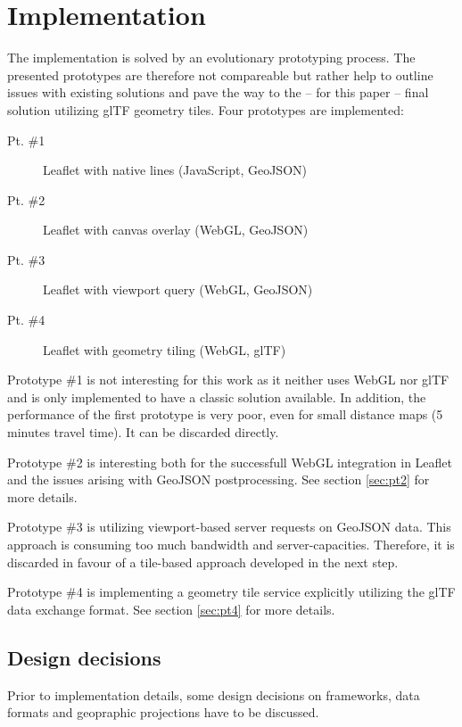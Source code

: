 \documentclass{motivation}
\begin{document}
\section{Implementation}
  The implementation is solved by an evolutionary prototyping process. The presented prototypes are therefore not compareable but rather help to outline issues with existing solutions and pave the way to the -- for this paper -- final solution utilizing glTF geometry tiles. Four prototypes are implemented:
  \begin{description}
    \item[Pt. \#1] Leaflet with native lines (JavaScript, GeoJSON)
    \item[Pt. \#2] Leaflet with canvas overlay (WebGL, GeoJSON)
    \item[Pt. \#3] Leaflet with viewport query (WebGL, GeoJSON)
    \item[Pt. \#4] Leaflet with geometry tiling (WebGL, glTF)
  \end{description}
  Prototype \#1 is not interesting for this work as it neither uses WebGL nor glTF and is only implemented to have a classic solution available. In addition, the performance of the first prototype is very poor, even for small distance maps (5 minutes travel time). It can be discarded directly.\par
  Prototype \#2 is interesting both for the successfull WebGL integration in Leaflet and the issues arising with GeoJSON postprocessing. See section \ref{sec:pt2} for more details.\par
  Prototype \#3 is utilizing viewport-based server requests on GeoJSON data. This approach is consuming too much bandwidth and server-capacities. Therefore, it is discarded in favour of a tile-based approach developed in the next step.\par
  Prototype \#4 is implementing a geometry tile service explicitly utilizing the glTF data exchange format. See section \ref{sec:pt4} for more details.

\subsection{Design decisions}
  Prior to implementation details, some design decisions on frameworks, data formats and geopraphic projections have to be discussed.
\end{document}
